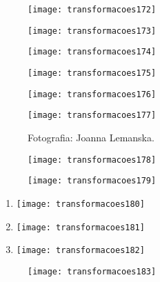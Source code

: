 \anexo

\begin{figure}[H]
\centering

\texttt{[image: transformacoes172]}
\end{figure}

\anexo

\begin{figure}[H]
\centering

\texttt{[image: transformacoes173]}
\end{figure}


\anexo

\begin{figure}[H]
\centering

\texttt{[image: transformacoes174]}
\end{figure}

\anexo

\begin{figure}[H]
\centering

\texttt{[image: transformacoes175]}
\end{figure}

\anexo

\begin{figure}[H]
\centering

\texttt{[image: transformacoes176]}
\end{figure}

\anexo

\begin{figure}[H]
\centering

\texttt{[image: transformacoes177]}
\caption{Fotografia: Joanna Lemanska.}
\end{figure}

\anexo

\begin{figure}[H]
\centering

\texttt{[image: transformacoes178]}
\end{figure}

\anexo

\begin{figure}[H]
\centering

\texttt{[image: transformacoes179]}
\end{figure}

\anexo

\begin{enumerate}[label=\textit{\alph*)}]
\item {}
{
\texttt{[image: transformacoes180]}
}

\item {}
{
\texttt{[image: transformacoes181]}
}

\item {}
{
\texttt{[image: transformacoes182]}
}
\end{enumerate}

\anexo

\begin{figure}[H]
\centering

\texttt{[image: transformacoes183]}
\end{figure}

\clearpage



\nocite{*}